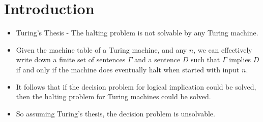 \documentclass[
11pt,notheorems,hyperref={pdfauthor=whatever}
]{beamer}
\begin{document}
\section{Introduction}
\begin{frame}
\begin{itemize}
    \setlength\itemsep{2em}
    \item Turing's Thesis - The halting problem is not solvable by any Turing machine.
    \item Given the machine table of a Turing machine, and any $n$, we can effectively write down a finite set of sentences $\Gamma$ and a sentence $D$ such that $\Gamma$ implies $D$ if and only if the machine does eventually halt when started with input $n$.
    \item It follows that if the decision problem for logical implication could be solved, then the halting problem for Turing machines could be solved.
    \item So assuming Turing's thesis, the decision problem is unsolvable.
\end{itemize}
\end{frame}
\end{document}
